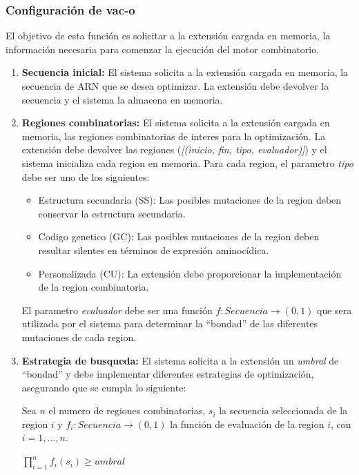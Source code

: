 \documentclass[10pt,a4paper]{article}
\begin{document}
  \subsubsection{Configuraci\'on de vac-o}
  El objetivo de esta funci\'on es solicitar a la extensi\'on cargada en memoria, la informaci\'on necesaria para comenzar la ejecuci\'on del motor combinatorio.
  \begin{enumerate}
    \item \textbf{Secuencia inicial:}
    El sistema solicita a la extensi\'on cargada en memoria, la secuencia de ARN que se desea optimizar. La extensi\'on debe devolver la secuencia y el sistema la almacena en memoria. 
    
    \item \textbf{Regiones combinatorias:}
    El sistema solicita a la extensi\'on cargada en memoria, las regiones combinatorias de interes para la optimizaci\'on. La extensi\'on debe devolver las regiones (\textit{[(inicio, fin, tipo, evaluador)]}) y el sistema inicializa cada region en memoria. Para cada region, el parametro \textit{tipo} debe ser uno de los siguientes:
    \begin{itemize}
      \item Estructura secundaria (SS): Las posibles mutaciones de la region deben conservar la estructura secundaria.
      \item Codigo genetico (GC): Las posibles mutaciones de la region deben resultar silentes en t\'erminos de expresi\'on aminoc\'idica.
      \item Personalizada (CU): La extensi\'on debe proporcionar la implementaci\'on de la region combinatoria.
    \end{itemize}

    El parametro \textit{evaluador} debe ser una funci\'on $f: Secuencia \rightarrow (0,1)$ que sera utilizada por el sistema para determinar la ``bondad'' de las diferentes mutaciones de cada region.

    \item \textbf{Estrategia de busqueda:}
    El sistema solicita a la extensi\'on un \textit{umbral} de ``bondad'' y debe implementar diferentes estrategias de optimizaci\'on, asegurando que se cumpla lo siguiente:

    Sea $n$ el numero de regiones combinatorias, $s_{i}$ la secuencia seleccionada de la region $i$ y $f_{i}: Secuencia \rightarrow (0,1)$ la funci\'on de evaluaci\'on de la region $i$, con $i=1, ..., n$.
    \begin{center}
    $\prod_{i=1}^{n} f_{i}(s_{i}) \ge umbral$
    \end{center}


\end{enumerate}
\end{document}
